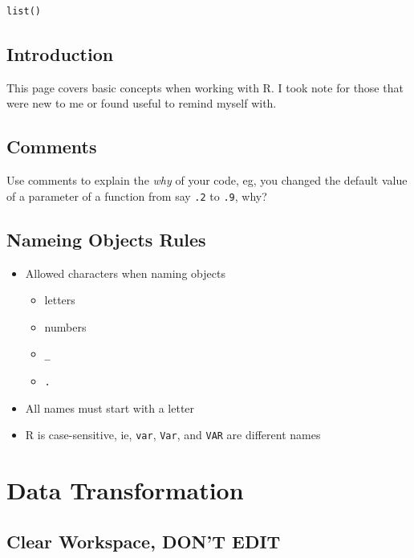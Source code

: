 \documentclass[
  letterpaper,
  DIV=11,
  numbers=noendperiod]{scrreprt}
\providecommand{\tightlist}{%
  \setlength{\itemsep}{0pt}\setlength{\parskip}{0pt}}\usepackage{longtable,booktabs,array}
\begin{document}
\begin{verbatim}
list()
\end{verbatim}

\section{Introduction}\label{introduction-1}

This page covers basic concepts when working with R. I took note for
those that were new to me or found useful to remind myself with.

\section{Comments}\label{comments}

Use comments to explain the \emph{why} of your code, eg, you changed the
default value of a parameter of a function from say \texttt{.2} to
\texttt{.9}, why?

\section{Nameing Objects Rules}\label{nameing-objects-rules}

\begin{itemize}
\tightlist
\item
  Allowed characters when naming objects

  \begin{itemize}
  \tightlist
  \item
    letters
  \item
    numbers
  \item
    \texttt{\_}
  \item
    \texttt{.}
  \end{itemize}
\item
  All names must start with a letter
\item
  R is case-sensitive, ie, \texttt{var}, \texttt{Var}, and \texttt{VAR}
  are different names
\end{itemize}

\chapter{Data Transformation}\label{data-transformation}

\section*{Clear Workspace, DON'T
EDIT}\label{clear-workspace-dont-edit-5}
\end{document}
